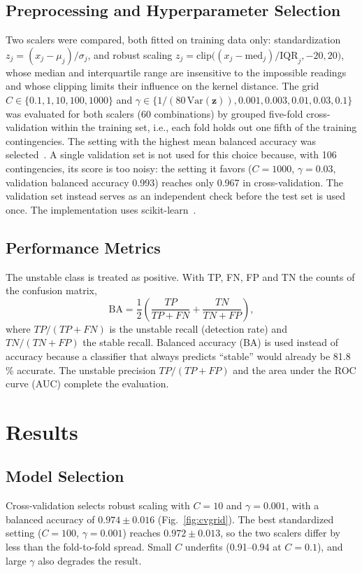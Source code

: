 \documentclass[conference]{IEEEtran}
\begin{document}
\subsection{Preprocessing and Hyperparameter Selection}
Two scalers were compared, both fitted on training data only: standardization
$z_j = (x_j - \mu_j)/\sigma_j$, and robust scaling
$z_j = \mathrm{clip}\bigl((x_j - \mathrm{med}_j)/\mathrm{IQR}_j, -20, 20\bigr)$, whose median and interquartile range
are insensitive to the impossible readings and whose clipping limits their influence on the kernel distance.
The grid $C \in \{0.1, 1, 10, 100, 1000\}$ and $\gamma \in \{1/(80\,\mathrm{Var}(\mathbf{z})), 0.001, 0.003, 0.01,
0.03, 0.1\}$ was evaluated for both scalers (60 combinations) by grouped five-fold cross-validation within the
training set, i.e., each fold holds out one fifth of the training contingencies. The setting with the highest mean
balanced accuracy was selected~\cite{hsu2003}. A single validation set is not used for this choice because, with
106 contingencies, its score is too noisy: the setting it favors ($C = 1000$, $\gamma = 0.03$, validation balanced
accuracy 0.993) reaches only 0.967 in cross-validation. The validation set instead serves as an independent check
before the test set is used once. The implementation uses scikit-learn~\cite{pedregosa2011}.

\subsection{Performance Metrics}
The unstable class is treated as positive. With TP, FN, FP and TN the counts of the confusion matrix,
\begin{equation}
  \mathrm{BA} = \frac{1}{2}\left(\frac{TP}{TP + FN} + \frac{TN}{TN + FP}\right),
\end{equation}
where $TP/(TP + FN)$ is the unstable recall (detection rate) and $TN/(TN + FP)$ the stable recall. Balanced accuracy
(BA) is used instead of accuracy because a classifier that always predicts ``stable'' would already be 81.8\,\%
accurate. The unstable precision $TP/(TP + FP)$ and the area under the ROC curve (AUC) complete the evaluation.

\section{Results}
\label{sec:results}
\subsection{Model Selection}
Cross-validation selects robust scaling with $C = 10$ and $\gamma = 0.001$, with a balanced accuracy of
$0.974 \pm 0.016$ (Fig.~\ref{fig:cvgrid}). The best standardized setting ($C = 100$, $\gamma = 0.001$) reaches
$0.972 \pm 0.013$, so the two scalers differ by less than the fold-to-fold spread. Small $C$ underfits
(0.91--0.94 at $C = 0.1$), and large $\gamma$ also degrades the result.
\end{document}
